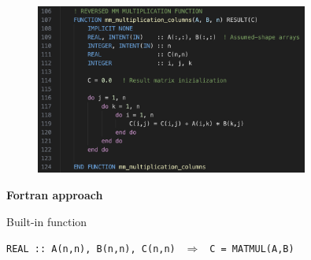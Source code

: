 \documentclass[10pt,externalviewer]{beamer}
\begin{document}
\begin{frame}
\begin{minipage}{0.45\textwidth}
\begin{center}
         \begin{figure}[H]
            \centering
            \includegraphics[width=0.8\textwidth]{Immagini/mm-multiplication-reversed-code.png}
         \end{figure}

      \end{center}
   \end{minipage}

   \vfill

   \begin{center}
      \small{\textcolor{BrickRed}{\textbf{Fortran approach}}}

      \footnotesize{Built-in function}

      \footnotesize{\texttt{REAL :: A(n,n), B(n,n), C(n,n)} $\ \ \Longrightarrow \ \ $ \texttt{C = \textcolor{BrickRed}{MATMUL(}A,B\textcolor{BrickRed}{)}}}
   \end{center}
\end{frame}
\end{document}
